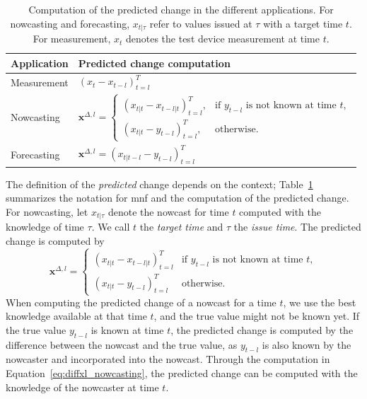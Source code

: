 \documentclass[pdflatex]{sn-jnl}
\theoremstyle{plain}%
\theoremstyle{definition}
\newcommand{\diffxl}{\mathbf{x}^{\Delta,l}}
\begin{document}
\begin{table}
    \centering
    \scriptsize
    \begin{tabular}{l l}
        \toprule
        Application & Predicted change computation \\
        \midrule
        Measurement & $(x_{t} - x_{t-l})_{t=l}^T $\\
        Nowcasting & $
\diffxl =
\begin{cases}
(x_{t|t} - x_{t-l|t})^T_{t=l}, & \text{if } y_{t-l} \text{ is not known at time } t, \\
(x_{t|t} - y_{t-l})^T_{t=l}, & \text{otherwise}.
\end{cases}
$ \\
        Forecasting & $ \diffxl = (x_{t|t-l} - y_{t-l})^T_{t=l}$\\
        \bottomrule
    \end{tabular}
    \caption[Computation of the predicted change in the different applications.]{Computation of the predicted change in the different applications. For nowcasting and forecasting, $x_{t | \tau}$ refer to values issued at $\tau$ with a target time $t$. For measurement, $x_t$ denotes the test device measurement at time $t$.}
    \label{tab:notation}
\end{table}

The definition of the \textit{predicted} change depends on the context;
Table~\ref{tab:notation} summarizes the notation for \ac{mnf} and the computation of the predicted change.
For nowcasting, let $x_{t | \tau}$ denote the nowcast for time $t$ computed with the knowledge of time $\tau$.
We call $t$ the \textit{target time} and $\tau$ the \textit{issue time}.
The predicted change is computed by
\begin{equation}
  \diffxl =
\begin{cases}
(x_{t|t} - x_{t-l|t})^T_{t=l} & \text{if } y_{t-l} \text{ is not known at time } t, \\
(x_{t|t} - y_{t-l})^T_{t=l} & \text{otherwise}.
\end{cases} \label{eq:diffxl_nowcasting}
\end{equation}
When computing the predicted change of a nowcast for a time $t$, we use the best knowledge available at that time $t$, and the true value might not be known yet.
If the true value $y_{t-l}$ is known at time $t$, the predicted change is computed by the difference between the nowcast and the true value, as $y_{t-l}$ is also known by the nowcaster and incorporated into the nowcast.
Through the computation in Equation~\eqref{eq:diffxl_nowcasting}, the predicted change can be computed with the knowledge of the nowcaster at time $t$.
\end{document}
